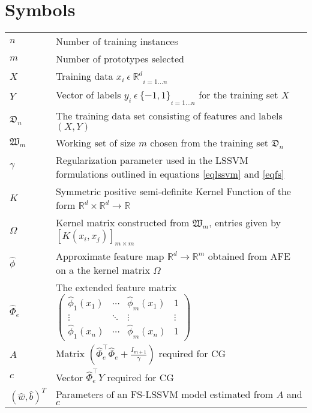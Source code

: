 \documentclass[master=mai,masteroption=ecs]{kulemt}
\begin{document}
\section*{Symbols}
\begin{flushleft}
  \renewcommand{\arraystretch}{1.1}
  \begin{tabularx}{\textwidth}{@{}p{12mm}X@{}}
    $n$ & Number of training instances\\
    $m$ & Number of prototypes selected\\
    $X $   & Training data ${x_i \ \epsilon \ \mathbb{R}^d}_{i = 1 \hdots n}$ \\
    $Y$   & Vector of labels ${y_i \ \epsilon \ \{-1, 1\}}_{i = 1 \hdots n}$ for the training set $X$ \\
    $\mathfrak{D}_n$ & The training data set consisting of features and labels $(X, Y)$\\
    $\mathfrak{W}_m$ & Working set of size $m$ chosen from the training set $\mathfrak{D}_n$\\
    $\gamma$ & Regularization parameter used in the LSSVM formulations outlined in equations \eqref{eqlssvm} and \eqref{eqfs}\\
    $K$ & Symmetric positive semi-definite Kernel Function of the form $\mathbb{R}^d \times \mathbb{R}^d \longrightarrow \mathbb{R}$ \\
    
    $\Omega$ & Kernel matrix constructed from $\mathfrak{W}_m$, entries given by $[K(x_i, x_j)]_{m \times m}$\\
    
    $\hat{\phi}$ & Approximate feature map $\mathbb{R}^d \longrightarrow \mathbb{R}^m$ obtained from AFE on a the kernel matrix $\Omega$ \\
    
    $\hat{\Phi}_e$ & The extended feature matrix $\begin{pmatrix}
\hat{\phi}_{1}(x_1) & \cdots & \hat{\phi}_{m}(x_1) & 1\\ 
\vdots &  \ddots & \vdots & \vdots\\ 
\hat{\phi}_{1}(x_n) & \cdots & \hat{\phi}_{m}(x_n) & 1
\end{pmatrix}$ \\
    $A$ & Matrix $\left (\hat{\Phi}^{\intercal}_e \hat{\Phi}_e + \frac{\mathit{I}_{m+1}}{\gamma} \right )$ required for CG\\
    $c$ & Vector $ \hat{\Phi}^{\intercal}_e Y$ required for CG\\
    $(\hat{w}, \hat{b})^T$ & Parameters of an FS-LSSVM model estimated from $A$ and $c$ \\
  \end{tabularx}
\end{flushleft}
\end{document}
